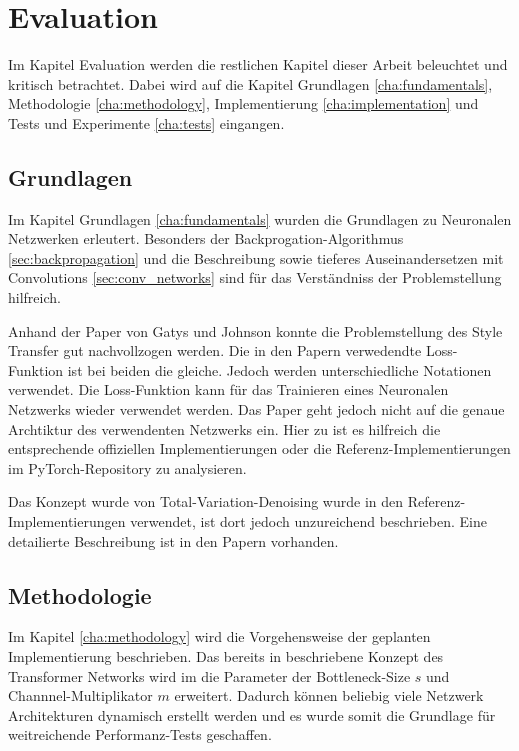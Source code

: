 \chapter{Evaluation}

Im Kapitel Evaluation werden die restlichen Kapitel dieser Arbeit beleuchtet und kritisch betrachtet. Dabei wird auf die Kapitel Grundlagen \ref{cha:fundamentals}, Methodologie \ref{cha:methodology}, Implementierung \ref{cha:implementation} und Tests und Experimente \ref{cha:tests} eingangen.

\section{Grundlagen}

Im Kapitel Grundlagen \ref{cha:fundamentals} wurden die Grundlagen zu Neuronalen Netzwerken erleutert. Besonders der Backprogation-Algorithmus \ref{sec:backpropagation} und die Beschreibung sowie tieferes Auseinandersetzen mit Convolutions \ref{sec:conv_networks} sind für das Verständniss der Problemstellung hilfreich.

Anhand der Paper von Gatys \cite{DBLP:journals/corr/GatysEB15a} und Johnson \cite{DBLP:journals/corr/JohnsonAL16} konnte die Problemstellung des Style Transfer gut nachvollzogen werden. Die in den Papern verwedendte Loss-Funktion ist bei beiden die gleiche. Jedoch werden unterschiedliche Notationen verwendet.
Die Loss-Funktion kann für das Trainieren eines Neuronalen Netzwerks wieder verwendet werden. Das Paper \cite{DBLP:journals/corr/JohnsonAL16} geht jedoch nicht auf die genaue Archtiktur des verwendenten Netzwerks ein. Hier zu ist es hilfreich die entsprechende offiziellen Implementierungen oder die Referenz-Implementierungen im PyTorch-Repository zu analysieren.

Das Konzept wurde von Total-Variation-Denoising wurde in den Referenz-Implementierungen verwendet, ist dort jedoch unzureichend beschrieben. Eine detailierte Beschreibung ist in den Papern \cite{RUDIN1992259, DBLP:journals/corr/EstrelaMS16} vorhanden.

\section{Methodologie}

Im Kapitel \ref{cha:methodology} wird die Vorgehensweise der geplanten Implementierung beschrieben. Das bereits in \cite{DBLP:journals/corr/JohnsonAL16} beschriebene Konzept des Transformer Networks wird im die Parameter der Bottleneck-Size $ s $ und Channnel-Multiplikator $ m $ erweitert. Dadurch können beliebig viele Netzwerk Architekturen dynamisch erstellt werden und es wurde somit die Grundlage für weitreichende Performanz-Tests geschaffen.

